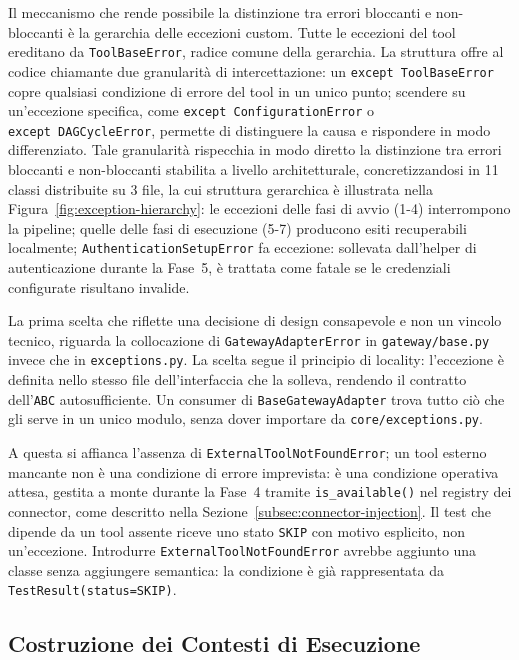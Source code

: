Il meccanismo che rende possibile la distinzione tra errori bloccanti e non-bloccanti è la gerarchia delle eccezioni custom. Tutte le eccezioni del tool ereditano da \texttt{ToolBaseError}, radice comune della gerarchia. La struttura offre al codice chiamante due granularità di intercettazione: un \texttt{except~ToolBaseError} copre qualsiasi condizione di errore del tool in un unico punto; scendere su un'eccezione specifica, come \texttt{except~ConfigurationError} o
\texttt{except~DAGCycleError}, permette di distinguere la causa e rispondere
in modo differenziato. Tale granularità rispecchia in modo diretto la distinzione tra errori bloccanti e non-bloccanti stabilita a livello architetturale, concretizzandosi in 11 classi distribuite su 3 file, la cui struttura gerarchica è illustrata nella Figura~\ref{fig:exception-hierarchy}: le eccezioni delle fasi di avvio (1-4) interrompono la pipeline; quelle delle fasi di esecuzione (5-7) producono esiti recuperabili localmente; \texttt{AuthenticationSetupError} fa eccezione: sollevata dall'helper di autenticazione durante la Fase~5, è trattata come fatale se le credenziali configurate risultano invalide.



La prima scelta che riflette una decisione di design consapevole e non un vincolo tecnico, riguarda la collocazione di \texttt{GatewayAdapterError} in \texttt{gateway/base.py} invece che in \texttt{exceptions.py}. La scelta segue il principio di locality: l'eccezione è definita nello stesso file dell'interfaccia che la solleva, rendendo il contratto dell'\texttt{ABC} autosufficiente. Un consumer di \texttt{BaseGatewayAdapter} trova tutto ciò che gli serve in un unico modulo, senza dover importare da \texttt{core/exceptions.py}.

A questa si affianca l'assenza di \texttt{ExternalToolNotFoundError}; un tool esterno mancante non è una condizione di errore imprevista: è una condizione operativa attesa, gestita a monte durante la Fase~4 tramite \texttt{is\_available()} nel registry dei connector, come descritto nella Sezione~\ref{subsec:connector-injection}. Il test che dipende da un tool assente riceve uno stato \texttt{SKIP} con motivo esplicito, non un'eccezione. Introdurre \texttt{ExternalToolNotFoundError} avrebbe aggiunto una classe senza aggiungere semantica: la condizione è già rappresentata da \texttt{TestResult(status=SKIP)}.


\subsection{Costruzione dei Contesti di Esecuzione}\label{subsec:split-state-impl}

